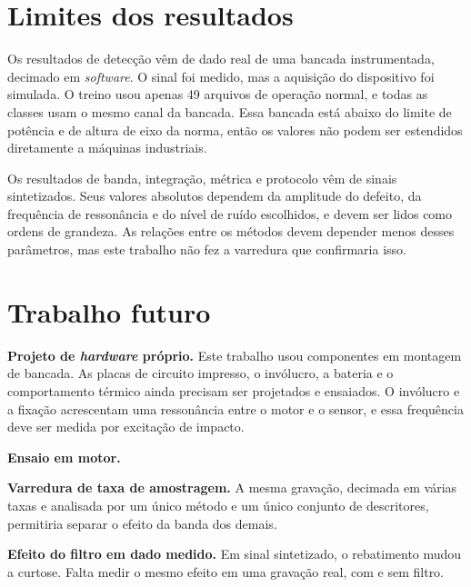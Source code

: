 \section{Limites dos resultados}
\label{sec:conc-alcance}

Os resultados de detecção vêm de dado real de uma bancada instrumentada, decimado em \emph{software}.
O sinal foi medido, mas a aquisição do dispositivo foi simulada. O treino usou apenas \num{49} arquivos
de operação normal, e todas as classes usam o mesmo canal da bancada. Essa bancada está abaixo do
limite de potência e de altura de eixo da norma, então os valores não podem ser estendidos diretamente
a máquinas industriais.

Os resultados de banda, integração, métrica e protocolo vêm de sinais sintetizados. Seus valores
absolutos dependem da amplitude do defeito, da frequência de ressonância e do nível de ruído escolhidos,
e devem ser lidos como ordens de grandeza. As relações entre os métodos devem depender menos desses
parâmetros, mas este trabalho não fez a varredura que confirmaria isso.


\section{Trabalho futuro}
\label{sec:conc-futuro}

\textbf{Projeto de \emph{hardware} próprio.} Este trabalho usou componentes em montagem de bancada. As
placas de circuito impresso, o invólucro, a bateria e o comportamento térmico ainda precisam ser
projetados e ensaiados. O invólucro e a fixação acrescentam uma ressonância entre o motor e o sensor, e
essa frequência deve ser medida por excitação de impacto.

\textbf{Ensaio em motor.} 

\textbf{Varredura de taxa de amostragem.} A mesma gravação, decimada em várias taxas e analisada por um
único método e um único conjunto de descritores, permitiria separar o efeito da banda dos demais.

\textbf{Efeito do filtro em dado medido.} Em sinal sintetizado, o rebatimento mudou a curtose. Falta
medir o mesmo efeito em uma gravação real, com e sem filtro.

